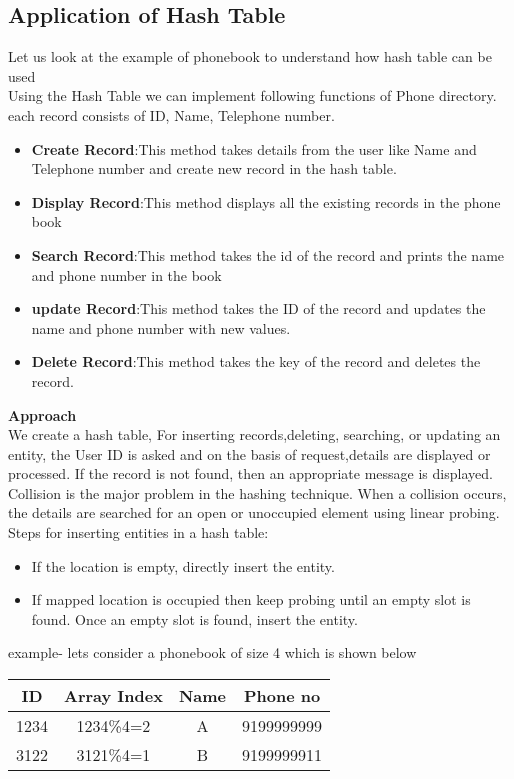 \documentclass[journal,12pt,twocolumn]{IEEEtran}
\begin{document}
\subsection{\textbf{Application of Hash Table}}
Let us look at the example of phonebook to understand how hash table can be used\\
Using the Hash Table we can implement following functions of Phone directory.
each record consists of ID, Name, Telephone number.
\begin{itemize}
\item \textbf{Create Record}:This method takes details from the user like Name and Telephone number and create new record in the hash table.
\item \textbf{Display Record}:This method displays all the existing records in the phone book
\item \textbf{Search Record}:This method takes the id of the record and prints the name and phone number in the book
\item \textbf{update Record}:This method takes the ID of the record and updates the name and phone number with new values.
\item \textbf{Delete Record}:This method takes the key of the record and deletes the record.
\end{itemize}
\textbf{Approach}
\\
We  create a hash table, For inserting records,deleting, searching, or updating an entity, the User ID is asked and on the basis of request,details are displayed or processed. If the record is not found, then an appropriate message is displayed.\\
Collision is the major problem in the hashing technique.
When a collision occurs, the details are searched for an open or unoccupied element using linear probing.
Steps for inserting entities in a hash table:
\begin{itemize}
\item If the location is empty, directly insert the entity.
\item If mapped location is occupied then keep probing until an empty slot is found. Once an empty slot is found, insert the entity.
\end{itemize}
example- lets consider a phonebook of size 4 which is shown below\\
\begin{center}
\begin{tabular}{ |c|c|c|c| } 
 \hline
ID&Array Index&Name&Phone no\\
\hline 
1234&1234\%4=2&A&9199999999\\
3122&3121\%4=1&B&9199999911\\
 \hline
\end{tabular}
\end{center}
\end{document}
